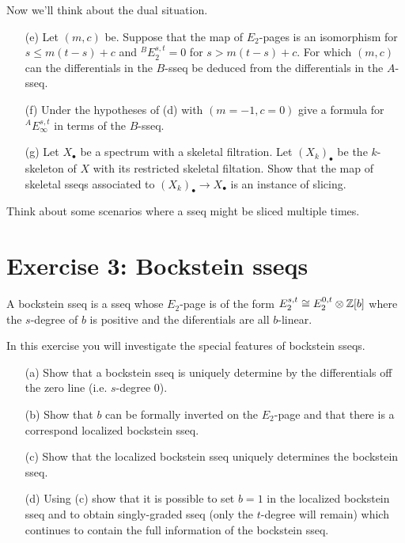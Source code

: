 \documentclass[reqno]{amsart}
\begin{document}
Now we'll think about the dual situation.

\begin{itemize}
\item[(e)] Let $(m,c)$ be.
  Suppose that the map of $E_2$-pages is an isomorphism
  for $s \leq m(t-s) + c$ and
  ${}^B E_2^{s,t} = 0$ for $s > m(t-s) + c$.
  For which $(m,c)$ can the differentials in the $B$-sseq be deduced from the
  differentials in the $A$-sseq.
\item[(f)] Under the hypotheses of (d)
  with $(m=-1,c=0)$ give a formula for ${}^AE_\infty^{s,t}$ in terms of the $B$-sseq.  
\item[(g)] Let $X_\bullet$ be a spectrum with a skeletal filtration.
  Let $(X_k)_{\bullet}$ be the $k$-skeleton of $X$ with its restricted skeletal filtation.
  Show that the map of skeletal sseqs associated to $(X_k)_\bullet \to X_\bullet$
  is an instance of slicing.      
\end{itemize}
  
Think about some scenarios where a sseq might be sliced multiple times.

\section{\bf Exercise 3: Bockstein sseqs}

A bockstein sseq is a sseq whose $E_2$-page is of the form
$E_2^{s,t} \cong E_2^{0,t} \otimes \mathbb{Z}[b]$
where the $s$-degree of $b$ is positive
and the diferentials are all $b$-linear.

In this exercise you will investigate the special features of bockstein sseqs.

\begin{itemize}
\item[(a)] Show that a bockstein sseq is uniquely determine by the differentials off the zero line (i.e. $s$-degree 0).
\item[(b)] Show that $b$ can be formally inverted on the $E_2$-page and that there is a correspond localized bockstein sseq.
\item[(c)] Show that the localized bockstein sseq uniquely determines the bockstein sseq.
\item[(d)] Using (c) show that it is possible to set $b=1$ in the localized bockstein sseq and to obtain singly-graded sseq (only the $t$-degree will remain) which continues to contain the full information of the bockstein sseq.
\end{itemize}
\end{document}
